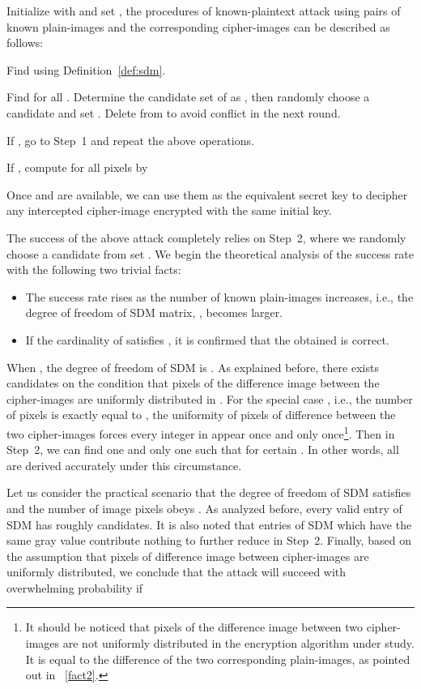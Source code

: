 \documentclass[smallextended, final]{svjour3}          \smartqed
\begin{document}
Initialize  with  and set , the procedures
of known-plaintext attack using  pairs of known plain-images and the corresponding cipher-images can be described as follows:
\begin{description}
\item[Step 1:] {Find  using Definition~\ref{def:sdm}}.
\item[Step 2:] Find  for all . Determine the candidate set of  as
, then randomly choose a candidate   and set . Delete  from 
to avoid conflict in the next round.
\item[Step 3:] If , go to Step~1 and repeat the above operations.
\item[Step 4:] If , compute  for all pixels by

\end{description}
Once  and  are available, we can use them as the equivalent secret key to decipher any intercepted cipher-image encrypted with the same initial key.

The success of the above attack completely relies on Step~2, where we randomly choose a candidate from set .
We begin the theoretical analysis of the success rate with the following two trivial facts:
\begin{itemize}
\item The success rate rises as the number of known plain-images  increases, i.e., the degree of freedom of SDM matrix, , becomes larger.
\item If the cardinality of  satisfies , it is confirmed that the  obtained is correct.
\end{itemize}
When , the degree of freedom of SDM is . As explained before, there exists  candidates on the condition that pixels of the difference
image between the cipher-images are uniformly distributed in .
For the special case , i.e., the number of pixels is exactly equal to , the uniformity of pixels of difference between the two cipher-images forces every integer in  appear once and only
once\footnote{It should be noticed that pixels of the difference image between two cipher-images are not uniformly distributed in the encryption algorithm under study.
It is equal to the difference of the two corresponding plain-images, as pointed out in ~\ref{fact2}.}.
Then in Step~2, we can find one and only one  such that  for certain .
In other words, all  are derived accurately under this circumstance.

Let us consider the practical scenario that the degree of freedom of SDM satisfies  and the number of image pixels obeys .
As analyzed before, every valid entry of SDM has roughly  candidates. It is also noted that entries of SDM which have the same
gray value contribute nothing to further reduce  in Step~2. Finally, based on the assumption that
pixels of difference image between cipher-images are uniformly distributed, we conclude that the attack will succeed with overwhelming probability if
\end{document}
